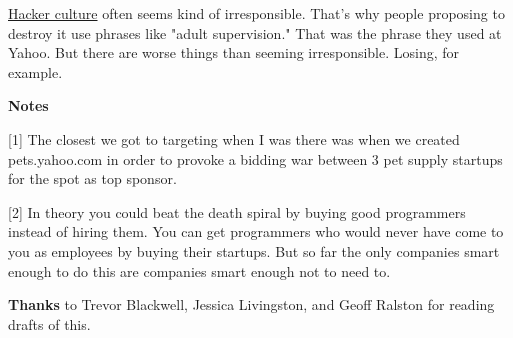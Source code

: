 \href{http://www.paulgraham.com/gba.html}{Hacker culture}
                    often seems kind of irresponsible. That's why people
                    proposing to destroy it use phrases like "adult
                    supervision." That was the phrase they used at Yahoo. But
                    there are worse things than seeming irresponsible. Losing,
                    for example.






                    \textbf{Notes}

[1] The closest we got to targeting when I was there was when
                    we created pets.yahoo.com in order to provoke a bidding war
                    between 3 pet supply startups for the spot as top
                    sponsor.

[2] In theory you could beat the death spiral by buying good
                    programmers instead of hiring them. You can get programmers
                    who would never have come to you as employees by buying
                    their startups. But so far the only companies smart enough
                    to do this are companies smart enough not to need to.

\textbf{Thanks}
                    to Trevor Blackwell, Jessica Livingston, and Geoff Ralston
                    for reading drafts of this.



              
            
          
            
              
                


                  
              
            
          

